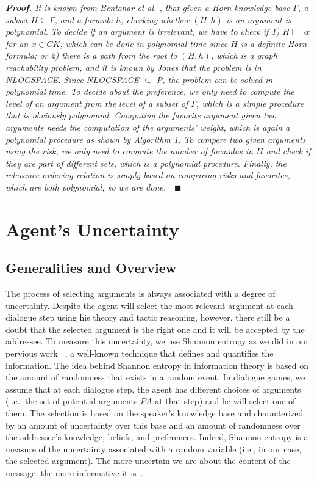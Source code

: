 \noindent\emph{\textbf{Proof.}} \emph{It is known from Bentahar et al. \cite{BentaharIEEEIS2007}, that given a Horn knowledge base
$\Gamma$, a subset $H \subseteq \Gamma$, and a formula $h$; checking whether $(H, h)$ is an argument is polynomial. To decide
if an argument is irrelevant, we have to check if 1) $H \vdash \neg x$ for an $x \in CK$, which can be done in polynomial time
since $H$ is a definite Horn formula; or 2) there is a path from the root to $(H, h)$, which is a graph reachability problem, and
it is known by Jones \cite{Jones} that the problem is in NLOGSPACE. Since NLOGSPACE $\subseteq$ P, the problem can be
solved in polynomial time. To decide about the preference, we only need to compute the level of an argument from the level of a
subset of $\Gamma$, which is  a simple procedure that is obviously polynomial. Computing the favorite argument given two arguments
needs the computation of the arguments' weight, which is again a polynomial procedure as shown by Algorithm 1. To compere two given
arguments using the risk, we only need to compute the number of formulas in $H$ and check if they are part of different sets,
which is a polynomial procedure. Finally, the relevance ordering relation is simply based on comparing risks and favorites, which
are both polynomial, so we are done.}~~$\blacksquare$
 \section{Agent's Uncertainty}\label{sec:uncertainty}

\subsection{Generalities and Overview}

The process of selecting arguments is always associated with a degree of uncertainty. Despite the agent will select the most relevant argument
at each dialogue step using his theory and tactic reasoning, however, there still be a doubt that the selected argument is the right one
and it will be accepted by the addressee.  To measure this uncertainty, we use Shannon entropy as we did in our pervious work ~\cite{MareyBE09}, a
well-known technique that defines and quantifies the information. The idea behind Shannon entropy in information theory is based on the amount of
randomness that exists in a random event. In dialogue games, we assume that at each dialogue step, the agent has different choices of arguments
(i.e., the set of potential arguments $PA$ at that step) and he will select one of them. The selection is based on the speaker's knowledge base and
characterized by an amount of uncertainty over this base and an amount of randomness over the addressee's knowledge, beliefs, and preferences. Indeed,
Shannon entropy is a measure of the uncertainty associated with a random variable (i.e., in our case, the selected argument). The more uncertain we are
about the content of the message, the more informative it is~\cite{CoverT91}.



